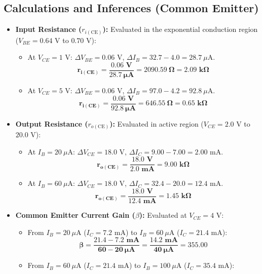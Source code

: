 \documentclass[11pt,a4paper]{article}
\begin{document}
\subsection{Calculations and Inferences (Common Emitter)}
\begin{itemize}
    \item \textbf{Input Resistance ($r_{i(\text{CE})}$):} Evaluated in the exponential conduction region ($V_{BE} = 0.64\text{ V}$ to $0.70\text{ V}$):
    \begin{itemize}
        \item At $V_{CE} = 1\text{ V}$: $\Delta V_{BE} = 0.06\text{ V}$, $\Delta I_B = 32.7 - 4.0 = 28.7\ \mu\text{A}$.
        \[
        \mathbf{r_{i(\text{CE})} = \frac{0.06\text{ V}}{28.7\ \mu\text{A}} = 2090.59\ \Omega = 2.09\text{ k}\Omega}
        \]
        \item At $V_{CE} = 5\text{ V}$: $\Delta V_{BE} = 0.06\text{ V}$, $\Delta I_B = 97.0 - 4.2 = 92.8\ \mu\text{A}$.
        \[
        \mathbf{r_{i(\text{CE})} = \frac{0.06\text{ V}}{92.8\ \mu\text{A}} = 646.55\ \Omega = 0.65\text{ k}\Omega}
        \]
    \end{itemize}
    \item \textbf{Output Resistance ($r_{o(\text{CE})}$):} Evaluated in active region ($V_{CE} = 2.0\text{ V}$ to $20.0\text{ V}$):
    \begin{itemize}
        \item At $I_B = 20\ \mu\text{A}$: $\Delta V_{CE} = 18.0\text{ V}$, $\Delta I_C = 9.00 - 7.00 = 2.00\text{ mA}$.
        \[
        \mathbf{r_{o(\text{CE})} = \frac{18.0\text{ V}}{2.0\text{ mA}} = 9.00\text{ k}\Omega}
        \]
        \item At $I_B = 60\ \mu\text{A}$: $\Delta V_{CE} = 18.0\text{ V}$, $\Delta I_C = 32.4 - 20.0 = 12.4\text{ mA}$.
        \[
        \mathbf{r_{o(\text{CE})} = \frac{18.0\text{ V}}{12.4\text{ mA}} = 1.45\text{ k}\Omega}
        \]
    \end{itemize}
    \item \textbf{Common Emitter Current Gain ($\beta$):} Evaluated at $V_{CE} = 4\text{ V}$:
    \begin{itemize}
        \item From $I_B = 20\ \mu\text{A}$ ($I_C = 7.2\text{ mA}$) to $I_B = 60\ \mu\text{A}$ ($I_C = 21.4\text{ mA}$):
        \[
        \mathbf{\beta = \frac{21.4 - 7.2\text{ mA}}{60 - 20\ \mu\text{A}} = \frac{14.2\text{ mA}}{40\ \mu\text{A}} = 355.00}
        \]
        \item From $I_B = 60\ \mu\text{A}$ ($I_C = 21.4\text{ mA}$) to $I_B = 100\ \mu\text{A}$ ($I_C = 35.4\text{ mA}$):

\end{itemize}
\end{itemize}
\end{document}
